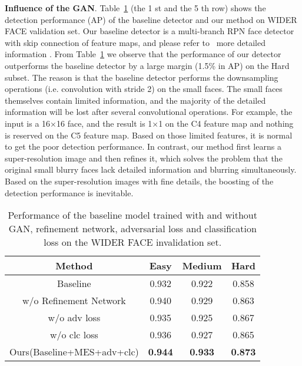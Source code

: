 \documentclass[10pt,twocolumn,letterpaper]{article}
\begin{document}
\textbf{Influence of the GAN}. Table~\ref{tab:experiment} (the 1
st and the 5
th row)
shows the detection performance (AP) of the baseline detector
and our method on WIDER FACE validation set. Our
baseline detector is a multi-branch RPN face detector with
skip connection of feature maps, and please refer to~\cite{Bai2017Multi}
more detailed information . From Table~\ref{tab:experiment} we observe that
the performance of our detector outperforms the baseline
detector by a large margin (1.5\% in AP) on the Hard subset.
The reason is that the baseline detector performs the downsampling
operations (i.e. convolution with stride 2) on the
small faces. The small faces themselves contain limited information,
and the majority of the detailed information will
be lost after several convolutional operations. For example,
the input is a 16×16 face, and the result is 1×1 on the
C4 feature map and nothing is reserved on the C5 feature
map. Based on those limited features, it is normal to get the
poor detection performance. In contrast, our method first
learns a super-resolution image and then refines it, which
solves the problem that the original small blurry faces lack
detailed information and blurring simultaneously. Based on
the super-resolution images with fine details, the boosting
of the detection performance is inevitable.\par

\begin{table}[htbp] 
 \caption{Performance of the baseline model trained with and without
GAN, refinement network, adversarial loss and classification
loss on the WIDER FACE invalidation set.} 
 \label{tab:experiment}
 \begin{tabular}{cccc} 
  \toprule 
 Method & Easy & Medium & Hard \\
 \midrule 
Baseline\cite{Bai2017Multi} & 0.932 & 0.922 & 0.858 \\
w/o Refinement Network & 0.940 & 0.929 & 0.863  \\
w/o adv loss & 0.935 & 0.925 & 0.867  \\
w/o clc loss & 0.936 & 0.927 & 0.865  \\
Ours(Baseline+MES+adv+clc) & \textbf{0.944} & \textbf{0.933} & \textbf{0.873} \\
  \bottomrule 
 \end{tabular} 
\end{table}
\end{document}
